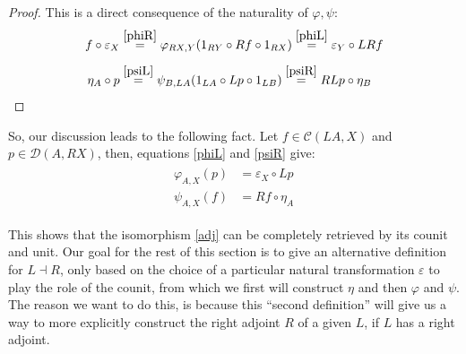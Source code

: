 \begin{proof}
This is a direct consequence of the naturality of $\varphi,\psi$:
\begin{align*}
f\circ\varepsilon_X&\overset{\eqref{phiR}}{=}\varphi_{RX,Y}(1_{RY}\circ Rf\circ 1_{RX})\overset{\eqref{phiL}}{=}\varepsilon_Y\circ LRf\\[0.5em]
\eta_A\circ p&\overset{\eqref{psiL}}{=}\psi_{B,LA}(1_{LA}\circ Lp\circ 1_{LB})\overset{\eqref{psiR}}{=}RLp\circ\eta_B\qedhere
\end{align*}
\end{proof}

So, our discussion leads to the following fact. Let $f\in\mathcal{C}(LA,X)$ and $p\in\mathcal{D}(A,RX)$, then, equations \eqref{phiL} and \eqref{psiR} give:
\begin{align}
\begin{split}
\varphi_{A,X}(p)&=\varepsilon_X\circ Lp\\[0.8em]
\psi_{A,X}(f)&=Rf\circ\eta_A
\end{split}\label{iso_from_unit}
\end{align}

This shows that the isomorphism \eqref{adj} can be completely retrieved by its counit and unit. Our goal for the rest of this section is to give an alternative definition for $L\dashv R$, only based on the choice of a particular natural transformation $\varepsilon$ to play the role of the counit, from which we first will construct $\eta$ and then $\varphi$ and $\psi$. The reason we want to do this, is because this ``second definition'' will give us a way to more explicitly construct the right adjoint $R$ of a given $L$, if $L$ has a right adjoint.

